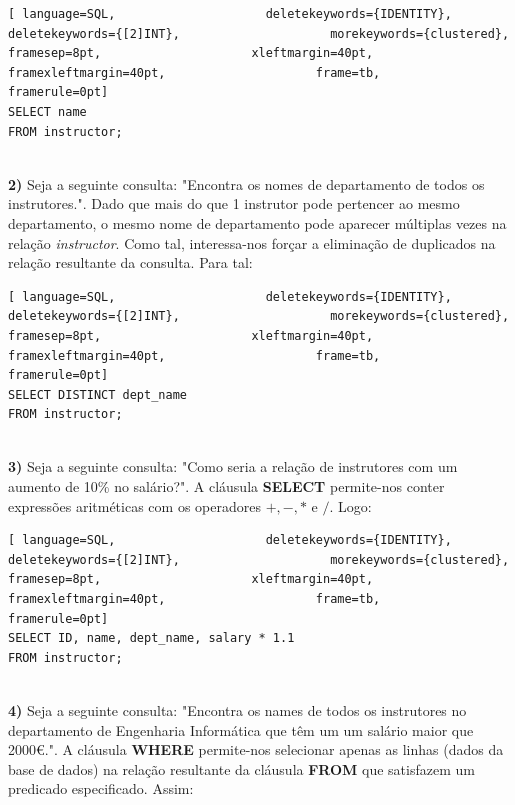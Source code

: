 \documentclass[titlepage]{book}
\theoremstyle{definition}
\begin{document}
\begin{lstlisting}[ language=SQL,                     deletekeywords={IDENTITY},                     deletekeywords={[2]INT},                     morekeywords={clustered},                     framesep=8pt,                     xleftmargin=40pt,                     framexleftmargin=40pt,                     frame=tb,                     framerule=0pt]
SELECT name
FROM instructor;
\end{lstlisting} \\
\textbf{2)} Seja a seguinte consulta: "Encontra os nomes de departamento de todos os instrutores.". Dado que mais do que 1 instrutor pode pertencer ao mesmo departamento, o mesmo nome de departamento pode aparecer múltiplas vezes na relação \textit{instructor}. Como tal, interessa-nos forçar a eliminação de duplicados na relação resultante da consulta. Para tal:

\begin{lstlisting}[ language=SQL,                     deletekeywords={IDENTITY},                     deletekeywords={[2]INT},                     morekeywords={clustered},                     framesep=8pt,                     xleftmargin=40pt,                     framexleftmargin=40pt,                     frame=tb,                     framerule=0pt]
SELECT DISTINCT dept_name
FROM instructor;
\end{lstlisting}\\
\textbf{3)} Seja a seguinte consulta: "Como seria a relação de instrutores com um aumento de 10\% no salário?". A cláusula \textbf{SELECT} permite-nos conter expressões aritméticas com os operadores $+, -, *$ e $/$. Logo:

\begin{lstlisting}[ language=SQL,                     deletekeywords={IDENTITY},                     deletekeywords={[2]INT},                     morekeywords={clustered},                     framesep=8pt,                     xleftmargin=40pt,                     framexleftmargin=40pt,                     frame=tb,                     framerule=0pt]
SELECT ID, name, dept_name, salary * 1.1
FROM instructor;
\end{lstlisting}\\
\textbf{4)} Seja a seguinte consulta: "Encontra os names de todos os instrutores no departamento de Engenharia Informática que têm um um salário maior que 2000€.". A cláusula \textbf{WHERE} permite-nos selecionar apenas as linhas (dados da base de dados) na relação resultante da cláusula \textbf{FROM} que satisfazem um predicado especificado. Assim:
\end{document}
